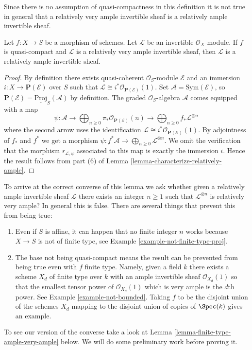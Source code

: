 \noindent
Since there is no assumption of quasi-compactness in this definition it is not
true in general that a relatively very ample invertible sheaf is a relatively
ample invertible sheaf.

\begin{lemma}
\label{lemma-ample-very-ample}
Let $f : X \to S$ be a morphism of schemes.
Let $\mathcal{L}$ be an invertible $\mathcal{O}_X$-module.
If $f$ is quasi-compact and $\mathcal{L}$ is a relatively
very ample invertible sheaf, then $\mathcal{L}$ is a relatively
ample invertible sheaf.
\end{lemma}

\begin{proof}
By definition there exists quasi-coherent $\mathcal{O}_S$-module
$\mathcal{E}$ and an immersion $i : X \to \mathbf{P}(\mathcal{E})$
over $S$ such that
$\mathcal{L} \cong i^*\mathcal{O}_{\mathbf{P}(\mathcal{E})}(1)$.
Set $\mathcal{A} = \text{Sym}(\mathcal{E})$, so
$\mathbf{P}(\mathcal{E}) = \underline{\text{Proj}}_S(\mathcal{A})$
by definition. The graded $\mathcal{O}_S$-algebra $\mathcal{A}$
comes equipped with a map
$$
\psi :
\mathcal{A} \to
\bigoplus\nolimits_{n \geq 0}
\pi_*\mathcal{O}_{\mathbf{P}(\mathcal{E})}(n) \to
\bigoplus\nolimits_{n \geq 0}
f_*\mathcal{L}^{\otimes n}
$$
where the second arrow uses the identification
$\mathcal{L} \cong i^*\mathcal{O}_{\mathbf{P}(\mathcal{E})}(1)$.
By adjointness of $f_*$ and $f^*$ we get a morphism
$\psi : f^*\mathcal{A} \to \bigoplus_{n \geq 0}\mathcal{L}^{\otimes n}$.
We omit the verification that the morphism $r_{\mathcal{L}, \psi}$
associated to this map is exactly the immersion $i$.
Hence the result follows from
part (6) of Lemma \ref{lemma-characterize-relatively-ample}.
\end{proof}

\noindent
To arrive at the correct converse of this lemma we ask
whether given a relatively ample
invertible sheaf $\mathcal{L}$ there exists an integer $n \geq 1$ such
that $\mathcal{L}^{\otimes n}$ is relatively very ample? In general this
is false. There are several things that prevent this from being true:
\begin{enumerate}
\item Even if $S$ is affine, it can happen that no finite integer
$n$ works because $X \to S$ is not of finite type, see
Example \ref{example-not-finite-type-proj}.
\item The base not being quasi-compact means the result can be
prevented from being true even with $f$ finite type. Namely, given
a field $k$ there exists a scheme $X_d$ of finite type over $k$ with
an ample invertible sheaf $\mathcal{O}_{X_d}(1)$ so that the smallest
tensor power of $\mathcal{O}_{X_d}(1)$ which is very ample is the $d$th
power. See Example \ref{example-not-bounded}.
Taking $f$ to be the disjoint union of the schemes $X_d$ mapping
to the disjoint union of copies of $\Spec(k)$ gives an example.
\end{enumerate}
To see our version of the converse take a look at
Lemma \ref{lemma-finite-type-ample-very-ample} below.
We will do some preliminary work before proving it.

